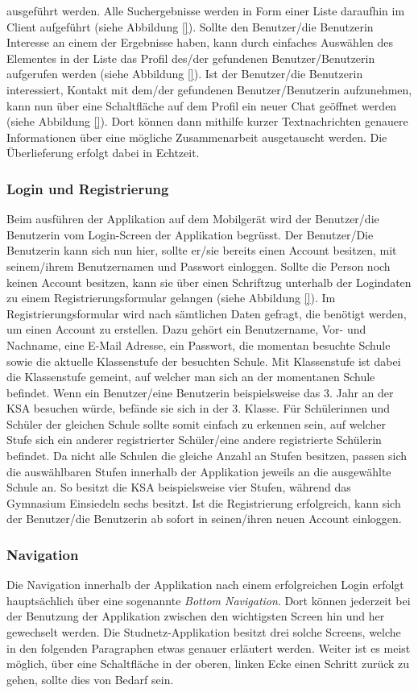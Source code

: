 \documentclass[../main.tex]{subfiles}
\begin{document}
ausgeführt werden. Alle Suchergebnisse werden in Form einer Liste daraufhin im Client aufgeführt (siehe Abbildung \ref{}). Sollte den Benutzer/die Benutzerin Interesse an einem der Ergebnisse haben, kann durch einfaches Auswählen des Elementes in der Liste das Profil des/der gefundenen Benutzer/Benutzerin aufgerufen werden (siehe Abbildung \ref{}). Ist der Benutzer/die Benutzerin interessiert, Kontakt mit dem/der gefundenen Benutzer/Benutzerin aufzunehmen, kann nun über eine Schaltfläche auf dem Profil ein neuer Chat geöffnet werden (siehe Abbildung \ref{}). Dort können dann mithilfe kurzer Textnachrichten genauere Informationen über eine mögliche Zusammenarbeit ausgetauscht werden. Die Überlieferung erfolgt dabei in Echtzeit.


\subsubsection*{Login und Registrierung}
Beim ausführen der Applikation auf dem Mobilgerät wird der Benutzer/die Benutzerin vom Login-Screen der Applikation begrüsst. Der Benutzer/Die Benutzerin kann sich nun hier, sollte er/sie bereits einen Account besitzen, mit seinem/ihrem Benutzernamen und Passwort einloggen. Sollte die Person noch keinen Account besitzen, kann sie über einen Schriftzug unterhalb der Logindaten zu einem Registrierungsformular gelangen (siehe Abbildung \ref{}). Im Registrierungsformular wird nach sämtlichen Daten gefragt, die benötigt werden, um einen Account zu erstellen. Dazu gehört ein Benutzername, Vor- und Nachname, eine E-Mail Adresse, ein Passwort, die momentan besuchte Schule sowie die aktuelle Klassenstufe der besuchten Schule. Mit Klassenstufe ist dabei die Klassenstufe gemeint, auf welcher man sich an der momentanen Schule befindet. Wenn ein Benutzer/eine Benutzerin beispielsweise das 3. Jahr an der KSA besuchen würde, befände sie sich in der 3. Klasse. Für Schülerinnen und Schüler der gleichen Schule sollte somit einfach zu erkennen sein, auf welcher Stufe sich ein anderer registrierter Schüler/eine andere registrierte Schülerin befindet. Da nicht alle Schulen die gleiche Anzahl an Stufen besitzen, passen sich die auswählbaren Stufen innerhalb der Applikation jeweils an die ausgewählte Schule an. So besitzt die KSA beispielsweise vier Stufen, während das Gymnasium Einsiedeln sechs besitzt. Ist die Registrierung erfolgreich, kann sich der Benutzer/die Benutzerin ab sofort in seinen/ihren neuen Account einloggen.

\subsubsection*{Navigation}
Die Navigation innerhalb der Applikation nach einem erfolgreichen Login erfolgt hauptsächlich über eine sogenannte \emph{Bottom Navigation}. Dort können jederzeit bei der Benutzung der Applikation zwischen den wichtigsten Screen hin und her gewechselt werden. Die Studnetz-Applikation besitzt drei solche Screens, welche in den folgenden Paragraphen etwas genauer erläutert werden. Weiter ist es meist möglich, über eine Schaltfläche in der oberen, linken Ecke einen Schritt zurück zu gehen, sollte dies von Bedarf sein.
\end{document}
